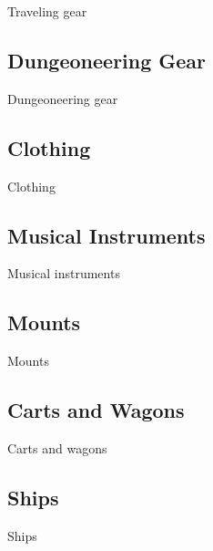 \begin{multicols}{2}
Traveling gear

\subsection{Dungeoneering Gear}

Dungeoneering gear

\subsection{Clothing}

Clothing

\subsection{Musical Instruments}

Musical instruments

\subsection{Mounts}

Mounts

\subsection{Carts and Wagons}

Carts and wagons

\subsection{Ships}

Ships

\end{multicols}
